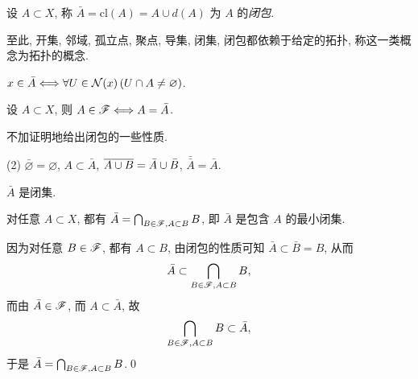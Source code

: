     \begin{Definition}[闭包]
        设 $ A\subset X $, 称 $ \bar{A}=\mathrm{cl}(A)=A\cup d(A) $ 为 $ A $ 的\emph{闭包}.
    \end{Definition}
    
    \begin{Remark}
        至此, 开集, 邻域, 孤立点, 聚点, 导集, 闭集, 闭包都依赖于给定的拓扑, 称这一类概念为拓扑的概念.
    \end{Remark}

    \begin{Proposition}
        $ x\in\bar{A}\Longleftrightarrow \forall U\in \CN(x)\,(U\cap A\ne \varnothing) $.
    \end{Proposition}

    \begin{Theorem}[用闭包刻画闭集]
        设 $ A\subset X $, 则 $ A\in\SF\Longleftrightarrow A=\bar{A} $.
    \end{Theorem}

    \begin{Proposition}[闭包的性质]
        不加证明地给出闭包的一些性质.
        \begin{lpbn}(2)
            \task $ \bar{\varnothing}=\varnothing $,
            \task $ A\subset \bar{A} $,
            \task $ \baro{A\cup B}=\bar{A}\cup \bar{B} $,
            \task $ \bar{\bar{A}}=\bar{A} $.
        \end{lpbn}
    \end{Proposition}

    \begin{Corollary}[闭包的闭性]
        $ \bar{A} $ 是闭集. 
    \end{Corollary}

    \begin{Theorem}[闭包的刻画]
        对任意 $ A\subset X $, 都有 $ \bar{A}=\bigcap_{B\in\SF, A\subset B}B $, 即 $ \bar{A} $ 是包含 $ A $ 的最小闭集. 
    \end{Theorem}
    \begin{Proof}
        因为对任意 $ B\in\SF $, 都有 $ A\subset B $, 由闭包的性质可知 $ \bar{A}\subset\bar{B}=B $, 从而
        \begin{align*}
            \bar{A}\subset\bigcap_{B\in\SF, A\subset B} B,
        \end{align*}
        而由 $ \bar{A}\in \SF $, 而 $ A\subset \bar{A} $, 故
        \begin{align*}
            \bigcap_{B\in\SF, A\subset B} B\subset\bar{A},
        \end{align*}
        于是 $ \bar{A}=\bigcap_{B\in\SF, A\subset B} B $.\qed
    \end{Proof}

